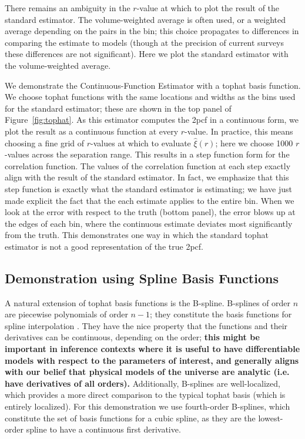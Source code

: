 \documentclass[modern]{aastex62}
\newcommand{\cf}{2pcf\xspace}
\newcommand{\est}{the Continuous-Function Estimator\xspace}
\newcommand{\new}[1]{\textbf{#1}}
\begin{document}
There remains an ambiguity in the $r$-value at which to plot the result of the standard estimator. 
The volume-weighted average is often used, or a weighted average depending on the pairs in the bin; this choice propagates to differences in comparing the estimate to models (though at the precision of current surveys these differences are not significant).
Here we plot the standard estimator with the volume-weighted average.

We demonstrate \est with a tophat basis function.
We choose tophat functions with the same locations and widths as the bins used for the standard estimator; these are shown in the top panel of Figure~\ref{fig:tophat}. 
As this estimator computes the \cf in a continuous form, we plot the result as a continuous function at every $r$-value.
In practice, this means choosing a fine grid of $r$-values at which to evaluate $\hat{\xi}(r)$; here we choose 1000 $r$-values across the separation range.
This results in a step function form for the correlation function.
The values of the correlation function at each step exactly align with the result of the standard estimator.
In fact, we emphasize that this step function is exactly what the standard estimator is estimating; we have just made explicit the fact that the each estimate applies to the entire bin.
When we look at the error with respect to the truth (bottom panel), the error blows up at the edges of each bin, where the continuous estimate deviates most significantly from the truth.
This demonstrates one way in which the standard tophat estimator is not a good representation of the true \cf.

\subsection{Demonstration using Spline Basis Functions}
\label{sec:spline}

A natural extension of tophat basis functions is the B-spline.
B-splines of order $n$ are piecewise polynomials of order $n-1$; they constitute the basis functions for spline interpolation \citep{deBoor1987}.
They have the nice property that the functions and their derivatives can be continuous, depending on the order; \new{this might be important in inference contexts where it is useful to have differentiable models with respect to the parameters of interest, and generally aligns with our belief that physical models of the universe are analytic (i.e. have derivatives of all orders).}
Additionally, B-splines are well-localized, which provides a more direct comparison to the typical tophat basis (which is entirely localized).
For this demonstration we use fourth-order B-splines, which constitute the set of basis functions for a cubic spline, as they are the lowest-order spline to have a continuous first derivative.
\end{document}
